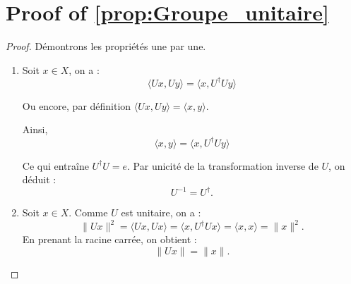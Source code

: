 \documentclass[a4paper,10pt]{article}
\theoremstyle{definition} %
\theoremstyle{definition} %
\theoremstyle{definition} %
\theoremstyle{definition} %
\newcommand{\E}[1]{\mathbb{E}\left[#1\right]}
\newcommand{\R}{\mathbb{R}}
\begin{document}
    

\section{Proof of \cref{prop:Groupe_unitaire}}\label{sec:proof_groupe_unitaire}
\begin{proof}
    Démontrons les propriétés une par une.

    \begin{enumerate}[label=(\roman*)]
        \item Soit $x \in X$, on a :
        \begin{equation*}
            \langle Ux, U y \rangle = \langle x, U^\dagger U y \rangle
        \end{equation*}
        
        Ou encore, par définition $\langle Ux, U y \rangle= \langle x, y \rangle $.

        Ainsi,
        \begin{equation*}
            \langle x, y \rangle = \langle x, U^\dagger U y \rangle
        \end{equation*}

        Ce qui entraîne $U^\dagger U = e$. Par unicité de la transformation inverse de $U$, on déduit :
        \[
        U^{-1} = U^\dagger.
        \]
        \item Soit \( x \in X \). Comme \( U \) est unitaire, on a :
        \[
        \|Ux\|^2 = \langle Ux, Ux \rangle = \langle x, U^\dagger U x \rangle = \langle x, x \rangle = \|x\|^2.
        \]
        En prenant la racine carrée, on obtient :
        \[
        \|Ux\| = \|x\|.
        \]


\end{enumerate}
\end{proof}
\end{document}
